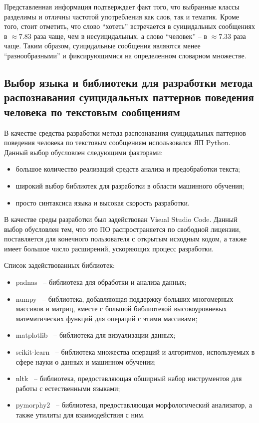 Представленная информация подтверждает факт того, что выбранные классы разделимы и отличны частотой употребления как слов, так и тематик. Кроме того, стоит отметить, что слово ``хотеть'' встречается в суицидальных сообщениях в $\approx 7.83$ раза чаще, чем в несуицидальных, а слово ``человек'' -- в $\approx 7.33$ раза чаще. Таким образом, суицидальные сообщения являются менее ``разнообразными'' и фиксирующимися на определенном словарном множестве.

\subsection{Выбор языка и библиотеки для разработки метода распознавания суицидальных паттернов поведения человека по текстовым сообщениям}

В качестве средства разработки метода распознавания суицидальных паттернов поведения человека по текстовым сообщениям использовался ЯП Python. Данный выбор обусловлен следующими факторами:

\begin{itemize}
	\item большое количество реализаций средств анализа и предобработки текста;
	\item широкий выбор библиотек для разработки в области машинного обучения;
	\item просто синтаксиса языка и высокая скорость разработки.
\end{itemize}

В качестве среды разработки был задействован Visual Studio Code. Данный выбор обусловлен тем, что это ПО распространяется по свободной лицензии, поставляется для конечного пользователя с открытым исходным кодом, а также имеет большое число расширений, ускоряющих процесс разработки.

Список задействованных библиотек:
\begin{itemize}
	\item padnas~\cite{pandas} -- библиотека для обработки и анализа данных;
	\item numpy~\cite{numpy} -- библиотека, добавляющая поддержку больших многомерных массивов и матриц, вместе с большой библиотекой высокоуровневых математических функций для операций с этими массивами;
	\item matplotlib~\cite{matplotlib} -- библиотека для визуализации данных;
	\item scikit-learn~\cite{sklearn} -- библиотека множества операций и алгоритмов, используемых в сфере науки о данных и машинном обучении;
	\item nltk~\cite{nltk} -- библиотека, предоставляющая обширный набор инструментов для работы с естественными языками;
	\item pymorphy2~\cite{pymorphy} -- библиотека, предоставляющая морфологический анализатор, а также утилиты для взаимодействия с ним.
\end{itemize}

